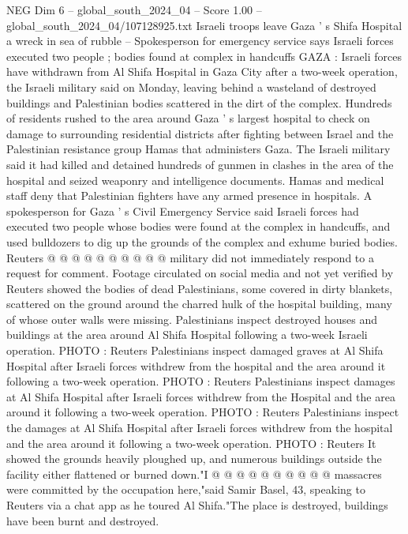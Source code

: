 \begin{textsample}{NEG Dim 6 – global\_south\_2024\_04 – Score 1.00 – global\_south\_2024\_04/107128925.txt}  \label{ex:f6_neg_335}
Israeli troops leave Gaza ' s Shifa Hospital a wreck in sea of rubble -- Spokesperson for emergency service says Israeli forces executed two people ; bodies found at complex in handcuffs GAZA : Israeli forces have withdrawn from Al Shifa Hospital in Gaza City after a two-week operation, the Israeli military said on Monday, leaving behind a wasteland of destroyed buildings and Palestinian bodies scattered in the dirt of the complex.
Hundreds of residents rushed to the area around Gaza ' s largest hospital to check on damage to surrounding residential districts after fighting between Israel and the Palestinian resistance group Hamas that administers Gaza.
The Israeli military said it had killed and detained hundreds of gunmen in clashes in the area of the hospital and seized weaponry and intelligence documents.
Hamas and medical staff deny that Palestinian fighters have any armed presence in hospitals.
A spokesperson for Gaza ' s Civil Emergency Service said Israeli forces had executed two people whose bodies were found at the complex in handcuffs, and used bulldozers to dig up the grounds of the complex and exhume buried bodies.
Reuters @ @ @ @ @ @ @ @ @ @ military did not immediately respond to a request for comment.
Footage circulated on social media and not yet verified by Reuters showed the bodies of dead Palestinians, some covered in dirty blankets, scattered on the ground around the charred hulk of the hospital building, many of whose outer walls were missing.
Palestinians inspect destroyed houses and buildings at the area around Al Shifa Hospital following a two-week Israeli operation.
PHOTO : Reuters Palestinians inspect damaged graves at Al Shifa Hospital after Israeli forces withdrew from the hospital and the area around it following a two-week operation.
PHOTO : Reuters Palestinians inspect damages at Al Shifa Hospital after Israeli forces withdrew from the Hospital and the area around it following a two-week operation.
PHOTO : Reuters Palestinians inspect the damages at Al Shifa Hospital after Israeli forces withdrew from the hospital and the area around it following a two-week operation.
PHOTO : Reuters It showed the grounds heavily ploughed up, and numerous buildings outside the facility either flattened or burned down."I @ @ @ @ @ @ @ @ @ @ massacres were committed by the occupation here,"said Samir Basel, 43, speaking to Reuters via a chat app as he toured Al Shifa."The place is destroyed, buildings have been burnt and destroyed.

\end{textsample}

